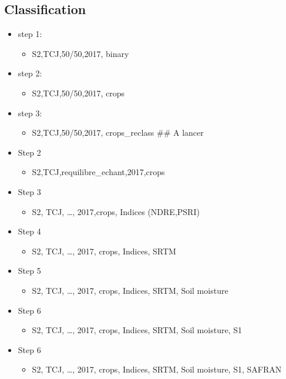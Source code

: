 \documentclass[11pt]{article}
\providecommand{\tightlist}{%
      \setlength{\itemsep}{0pt}\setlength{\parskip}{0pt}}
\begin{document}
    \hypertarget{classification}{%
\subsection{Classification}\label{classification}}

\begin{itemize}
\tightlist
\item
  step 1:

  \begin{itemize}
  \tightlist
  \item
    S2,TCJ,50/50,2017, binary
  \end{itemize}
\item
  step 2:

  \begin{itemize}
  \tightlist
  \item
    S2,TCJ,50/50,2017, crops
  \end{itemize}
\item
  step 3:

  \begin{itemize}
  \tightlist
  \item
    S2,TCJ,50/50,2017, crops\_reclass \#\# A lancer
  \end{itemize}
\item
  Step 2

  \begin{itemize}
  \tightlist
  \item
    S2,TCJ,requilibre\_echant,2017,crops
  \end{itemize}
\item
  Step 3

  \begin{itemize}
  \tightlist
  \item
    S2, TCJ, \ldots{}, 2017,crops, Indices (NDRE,PSRI)
  \end{itemize}
\item
  Step 4

  \begin{itemize}
  \tightlist
  \item
    S2, TCJ, \ldots{}, 2017, crops, Indices, SRTM
  \end{itemize}
\item
  Step 5

  \begin{itemize}
  \tightlist
  \item
    S2, TCJ, \ldots{}, 2017, crops, Indices, SRTM, Soil moisture
  \end{itemize}
\item
  Step 6

  \begin{itemize}
  \tightlist
  \item
    S2, TCJ, \ldots{}, 2017, crops, Indices, SRTM, Soil moisture, S1
  \end{itemize}
\item
  Step 6

  \begin{itemize}
  \tightlist
  \item
    S2, TCJ, \ldots{}, 2017, crops, Indices, SRTM, Soil moisture, S1,
    SAFRAN
  \end{itemize}
\end{itemize}


    
    
    
    
\end{document}
